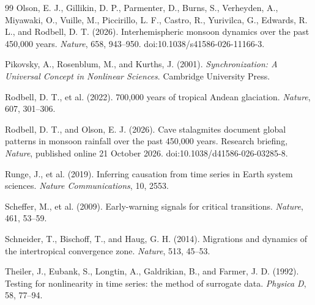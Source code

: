 \documentclass[11pt]{article}
\theoremstyle{definition}
\begin{document}
\begin{thebibliography}{99}
 Olson, E. J., Gillikin, D. P., Parmenter, D., Burns, S., Verheyden, A., Miyawaki, O., Vuille, M., Piccirillo, L. F., Castro, R., Yurivilca, G., Edwards, R. L., and Rodbell, D. T. (2026). Interhemispheric monsoon dynamics over the past 450,000 years. \emph{Nature}, 658, 943--950. doi:10.1038/s41586-026-11166-3.



 Pikovsky, A., Rosenblum, M., and Kurths, J. (2001). \emph{Synchronization: A Universal Concept in Nonlinear Sciences}. Cambridge University Press.

 Rodbell, D. T., et al. (2022). 700,000 years of tropical Andean glaciation. \emph{Nature}, 607, 301--306.

 Rodbell, D. T., and Olson, E. J. (2026). Cave stalagmites document global patterns in monsoon rainfall over the past 450,000 years. Research briefing, \emph{Nature}, published online 21 October 2026. doi:10.1038/d41586-026-03285-8.

 Runge, J., et al. (2019). Inferring causation from time series in Earth system sciences. \emph{Nature Communications}, 10, 2553.

 Scheffer, M., et al. (2009). Early-warning signals for critical transitions. \emph{Nature}, 461, 53--59.

 Schneider, T., Bischoff, T., and Haug, G. H. (2014). Migrations and dynamics of the intertropical convergence zone. \emph{Nature}, 513, 45--53.

 Theiler, J., Eubank, S., Longtin, A., Galdrikian, B., and Farmer, J. D. (1992). Testing for nonlinearity in time series: the method of surrogate data. \emph{Physica D}, 58, 77--94.

\end{thebibliography}
\end{document}
